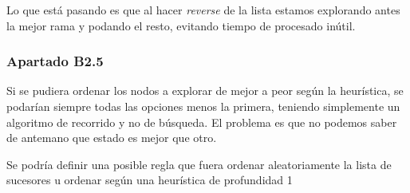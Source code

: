 \documentclass[nochap]{apuntes}
\begin{document}
Lo que está pasando es que al hacer \textit{reverse} de la lista estamos explorando antes la mejor rama y podando el resto, evitando tiempo de procesado inútil.

\subsubsection*{Apartado B2.5}
Si se pudiera ordenar los nodos a explorar de mejor a peor según la heurística, se podarían siempre todas las opciones menos la primera, teniendo simplemente un algoritmo de recorrido y no de búsqueda. El problema es que no podemos saber de antemano que estado es mejor que otro.

Se podría definir una posible regla que fuera ordenar aleatoriamente la lista de sucesores u ordenar según una heurística de profundidad 1
\end{document}
